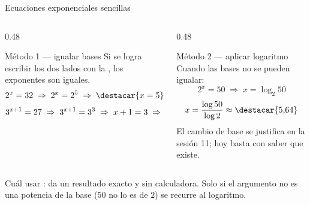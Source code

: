 \documentclass[aspectratio=169,10pt]{beamer}
\begin{document}
\begin{frame}{Ecuaciones exponenciales sencillas}
  \scriptsize
  \begin{columns}[T,onlytextwidth]
    \begin{column}{0.48\textwidth}
      \begin{block}{Método 1 — igualar bases}
        \tiny
        Si se logra escribir los dos lados con la , los
        exponentes son iguales.
        \[ 2^{x} = 32 \;\Rightarrow\; 2^{x} = 2^{5}
           \;\Rightarrow\; \destacar{x = 5} \]
        \[ 3^{x+1} = 27 \;\Rightarrow\; 3^{x+1}=3^{3}
           \;\Rightarrow\; x+1 = 3 \;\Rightarrow\; \destacar{x=2} \]
      \end{block}
    \end{column}
    \begin{column}{0.48\textwidth}
      \begin{block}{Método 2 — aplicar logaritmo}
        \tiny
        Cuando las bases no se pueden igualar:
        \[ 2^{x} = 50 \;\Rightarrow\; x = \log_{2}50 \]
        \[ x = \frac{\log 50}{\log 2} \approx \destacar{5{,}64} \]
        {\color{uniGris} El cambio de base se justifica en la sesión 11; hoy
        basta con saber que existe.}
      \end{block}
    \end{column}
  \end{columns}

  \vspace{0.1cm}
  \begin{alertblock}{Cuál usar}
    \scriptsize
    : da un resultado exacto
    y sin calculadora. Solo si el argumento no es una potencia de la base
    ($50$ no lo es de $2$) se recurre al logaritmo.
  \end{alertblock}
\end{frame}
\end{document}
